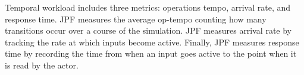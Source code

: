 Temporal workload includes three metrics: operations tempo, arrival rate, and response time.  JPF measures the average op-tempo counting how many transitions occur over a course of the simulation. JPF measures arrival rate by tracking the rate at which inputs become active. Finally, JPF measures response time by recording the time from when an input goes active to the point when it is read by the actor. \\

